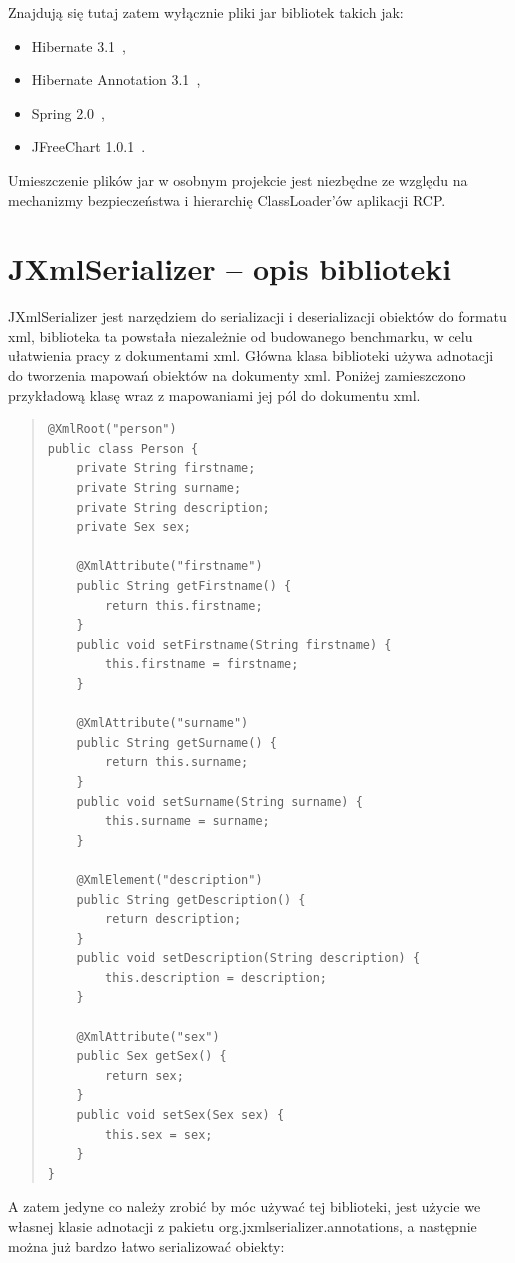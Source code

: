 \begin{itemize}
Znajdują się tutaj zatem wyłącznie pliki jar bibliotek takich jak:
\begin{itemize}
\item Hibernate 3.1~\cite{Hibernate1},
\item Hibernate Annotation 3.1~\cite{HibernateAnn1},
\item Spring 2.0~\cite{Spring1},
\item JFreeChart 1.0.1~\cite{JFreeChart1}.
\end{itemize} 
Umieszczenie plików jar w osobnym projekcie jest niezbędne ze względu na mechanizmy bezpieczeństwa i hierarchię ClassLoader'ów
aplikacji RCP.
\end{itemize}

\section{JXmlSerializer -- opis biblioteki}%
JXmlSerializer jest narzędziem do serializacji i deserializacji obiektów do formatu xml,
biblioteka ta powstała niezależnie od budowanego benchmarku, w celu ułatwienia pracy z dokumentami xml.
Główna klasa biblioteki używa adnotacji do tworzenia mapowań obiektów na dokumenty xml.
Poniżej zamieszczono przykładową klasę wraz z mapowaniami jej pól do dokumentu xml. 
\begin{quote}
\begin{Verbatim}
@XmlRoot("person")
public class Person {
	private String firstname;
	private String surname;
	private String description;
	private Sex sex;

	@XmlAttribute("firstname")
	public String getFirstname() {
		return this.firstname;
	}
	public void setFirstname(String firstname) {
		this.firstname = firstname;
	}

	@XmlAttribute("surname")
	public String getSurname() {
		return this.surname;
	}
	public void setSurname(String surname) {
		this.surname = surname;
	}

	@XmlElement("description")
	public String getDescription() {
		return description;
	}
	public void setDescription(String description) {
		this.description = description;
	}
	
	@XmlAttribute("sex")
	public Sex getSex() {
		return sex;
	}
	public void setSex(Sex sex) {
		this.sex = sex;
	}
}
\end{Verbatim}
\end{quote}
A zatem jedyne co należy zrobić by móc używać tej biblioteki, jest użycie we własnej klasie adnotacji 
z pakietu org.jxmlserializer.annotations, a następnie można już bardzo łatwo serializować obiekty:
